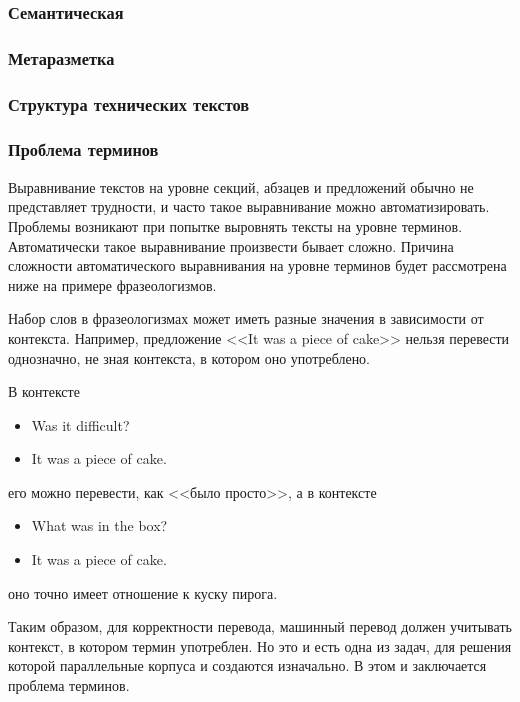 \blindtext

\subsubsection*{Семантическая}

\blindtext

\subsubsection*{Метаразметка}

\blindtext

\subsubsection{Структура технических текстов}

\subsubsection{Проблема терминов}

Выравнивание текстов на уровне секций, абзацев и предложений обычно не представляет трудности, и часто такое выравнивание можно автоматизировать.
Проблемы возникают при попытке выровнять тексты на уровне терминов.
Автоматически такое выравнивание произвести бывает сложно.
Причина сложности автоматического выравнивания на уровне терминов будет рассмотрена ниже на примере фразеологизмов.

Набор слов в фразеологизмах может иметь разные значения в зависимости от контекста.
Например, предложение <<It was a piece of cake>> нельзя перевести однозначно, не зная контекста, в котором оно употреблено.

В контексте 
\begin{itemize}
    \item Was it difficult?
    \item It was a piece of cake.
\end{itemize}
его можно перевести, как <<было просто>>, а в контексте
\begin{itemize}
    \item What was in the box?
    \item It was a piece of cake.
\end{itemize}
оно точно имеет отношение к куску пирога.

Таким образом, для корректности перевода, машинный перевод должен учитывать контекст, в котором термин употреблен.
Но это и есть одна из задач, для решения которой параллельные корпуса и создаются изначально.
В этом и заключается проблема терминов.

